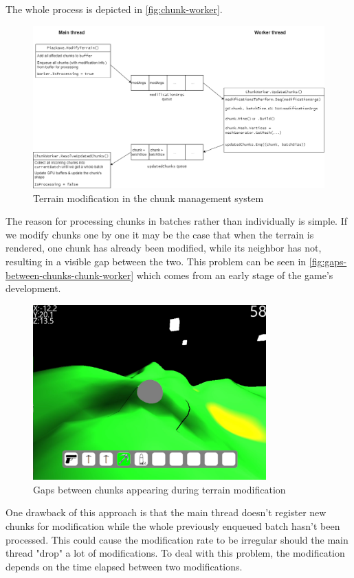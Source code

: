 The whole process is depicted in \autoref{fig:chunk-worker}.
\begin{figure}[h] %
    \centering
    \includegraphics[width=1\textwidth]{chapters/system_architecture/sections/chunk_worker/resources/chunkWorker.drawio.png}
    \caption{Terrain modification in the chunk management system}
    \label{fig:chunk-worker}
\end{figure}

The reason for processing chunks in batches rather than individually is simple.
If we modify chunks one by one it may be the case that when the terrain is rendered, one chunk has already been modified, while its neighbor has not, resulting in a visible gap between the two.
This problem can be seen in \autoref{fig:gaps-between-chunks-chunk-worker} which comes from an early stage of the game's development.
\begin{figure}[h]
    \centering
    \includegraphics[width=0.8\textwidth]{chapters/system_architecture/sections/chunk_worker/resources/gaps-between-chunks.png}
    \caption{Gaps between chunks appearing during terrain modification}
    \label{fig:gaps-between-chunks-chunk-worker}
\end{figure}

One drawback of this approach is that the main thread doesn't register new chunks for modification while the whole previously enqueued batch hasn't been processed.
This could cause the modification rate to be irregular should the main thread "drop" a lot of modifications.
To deal with this problem, the modification depends on the time elapsed between two modifications.